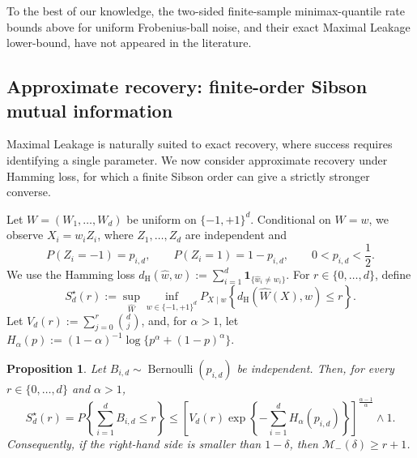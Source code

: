 \documentclass[11pt]{article}
\newtheorem{proposition}[theorem]{Proposition}
\theoremstyle{definition}
\theoremstyle{remark}
\newcommand{\1}{\boldsymbol{1}}
\begin{document}
To the best of our knowledge, the two-sided
finite-sample minimax-quantile rate bounds above for uniform Frobenius-ball
noise, and their exact Maximal Leakage lower-bound, have not appeared in the literature. 

\subsection{Approximate recovery: finite-order Sibson mutual information}
\label{sec:bsc-hamming}

Maximal Leakage is naturally suited to exact recovery, where success
requires identifying a single parameter. We now consider approximate
recovery under Hamming loss, for which a finite Sibson order can give a
strictly stronger converse.

Let \(W=(W_1,\ldots,W_d)\) be uniform on \(\{-1,+1\}^d\). Conditional on
\(W=w\), we observe \(X_i=w_iZ_i\), where \(Z_1,\ldots,Z_d\) are
independent and
\[
P(Z_i=-1)=p_{i,d},
\qquad
P(Z_i=1)=1-p_{i,d},
\qquad
0<p_{i,d}<\frac12.
\]
We use the Hamming loss
\(d_{\mathrm H}(\widehat w,w)
:=\sum_{i=1}^d\1_{\{\widehat w_i\neq w_i\}}\).
For \(r\in\{0,\ldots,d\}\), define
\[
S_d^\star(r)
:=
\sup_{\widehat W}
\inf_{w\in\{-1,+1\}^d}
P_{X\mid w}
\left\{
d_{\mathrm H}(\widehat W(X),w)\le r
\right\}.
\]
Let \(V_d(r):=\sum_{j=0}^r\binom dj\), and, for \(\alpha>1\), let
\(H_\alpha(p):=(1-\alpha)^{-1}
\log\{p^\alpha+(1-p)^\alpha\}\).

\begin{proposition}
\label{prop:heterogeneousSibsonConverse}
Let \(B_{i,d}\sim\operatorname{Bernoulli}(p_{i,d})\) be independent.
Then, for every \(r\in\{0,\ldots,d\}\) and \(\alpha>1\),
\begin{equation}
S_d^\star(r)
=
P\left\{\sum_{i=1}^dB_{i,d}\le r\right\}
\le
\left[
V_d(r)
\exp\left\{
-\sum_{i=1}^dH_\alpha(p_{i,d})
\right\}
\right]^{\frac{\alpha-1}{\alpha}}
\wedge1.
\label{eq:heterogeneousSibsonBound}
\end{equation}
Consequently, if the right-hand side is smaller than \(1-\delta\), then
\(\mathcal M_-(\delta)\ge r+1\).
\end{proposition}
\end{document}
